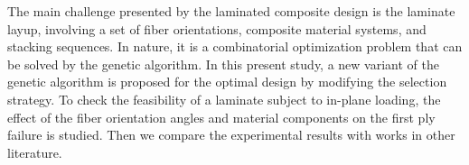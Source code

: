 The main challenge presented by the laminated composite design is the laminate
layup, involving a set of fiber orientations, composite material systems, and
stacking sequences. In nature, it is a combinatorial optimization problem that
can be solved by the genetic algorithm. In this present study, a new variant of
the genetic algorithm is proposed for the optimal design by modifying the
selection strategy.  To check the feasibility of a laminate subject to in-plane
loading, the effect of the fiber orientation angles and material components on
the first ply failure is studied. Then we compare the experimental results with
works in other literature.
